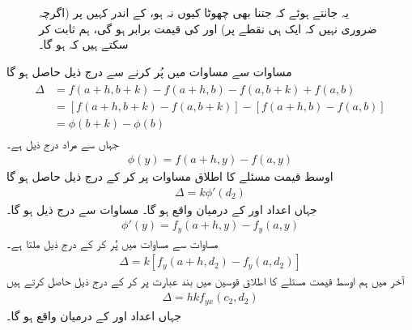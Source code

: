 \begin{figure}
\centering
{}
\caption{
یہ جانتے ہوئے  کہ  جتنا بھی چھوٹا کیوں نہ ہو،  کے اندر  کہیں پر  (اگرچہ ضروری نہیں کہ ایک ہی نقطے پر)   اور  کی قیمت  برابر ہو گی، ہم   ثابت کر سکتے ہیں کہ     ہو گا۔
}
\label{شکل_ضمیمہ_بڑھوتری}
\end{figure}

مساوات  سے مساوات  میں پُر  کرنے سے درج ذیل حاصل ہو گا
\begin{gather}
\begin{aligned}\label{مساوات_ضمیمہ_یولر_ث}
\Delta&=f(a+h,b+k)-f(a+h,b)-f(a,b+k)+f(a,b)\\
&=[f(a+h,b+k)-f(a,b+k)]-[f(a+h,b)-f(a,b)]\\
&=\phi(b+k)-\phi(b)
\end{aligned}
\end{gather}
جہاں  سے مراد   درج ذیل  ہے۔
\begin{align}\label{مساوات_ضمیمہ_یولر_ج}
\phi(y)=f(a+h,y)-f(a,y)
\end{align}
اوسط قیمت مسئلے کا اطلاق مساوات  پر کر کے  درج ذیل حاصل ہو گا
\begin{align}\label{مساوات_ضمیمہ_یولر_چ}
\Delta=k\phi'(d_2)
\end{align}
جہاں  اعداد  اور  کے  درمیان واقع  ہو گا۔ مساوات  سے درج ذیل ہو گا۔
\begin{align}\label{مساوات_ضمیمہ_یولر_ح}
\phi'(y)=f_y(a+h,y)-f_y(a,y)
\end{align}
مساوات  سے مساوات  میں پُر  کر کے درج  ذیل ملتا ہے۔
\begin{align*}
\Delta=k[f_y(a+h,d_2)-f_y(a,d_2)]
\end{align*}
آخر میں ہم اوسط  قیمت  مسئلے کا اطلاق   قوسین میں بند  عبارت  پر کر کے درج ذیل حاصل کرتے ہیں
\begin{align}\label{مساوات_ضمیمہ_یولر_خ}
\Delta=hkf_{yx}(c_2,d_2)
\end{align}
جہاں  اعداد  اور  کے درمیان واقع ہو گا۔

